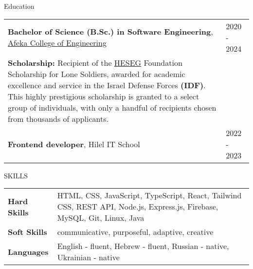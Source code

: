 \documentclass{resume}
\begin{document}

 \begin{rSection}{Education}

  \begin{tabular}{@{}p{}p{}}
  {\bf Bachelor of Science (B.Sc.) in Software Engineering}, \href{https://www.afeka.ac.il/}{Afeka College of Engineering} & \hfill 2020 - 2024\hspace*{1em} \\
  \textbf{Scholarship:} Recipient of the \href{https://www.heseg.com/}{HESEG} Foundation Scholarship for Lone Soldiers, awarded for academic excellence and service in the Israel Defense Forces \textbf{(IDF)}. This highly prestigious scholarship is granted to a select group of individuals, with only a handful of recipients chosen from thousands of applicants. & \hfill \\
  {\bf Frontend developer}, Hilel IT School & \hfill 2022 - 2023\hspace*{1em} \\
  \end{tabular}
 \end{rSection}












 \begin{rSection}{SKILLS}
  \begin{tabularx}{\textwidth}{@{}>{\bfseries}l X@{}}
   Hard Skills & HTML, CSS, JavaScript, TypeScript, React, Tailwind CSS, REST API, Node.js, Express.js, Firebase, MySQL, Git, Linux, Java \\
   Soft Skills & communicative, purposeful, adaptive, creative\\
   Languages & English - fluent, Hebrew - fluent, Russian - native, Ukrainian - native
  \end{tabularx}

 \end{rSection}

\end{document}

